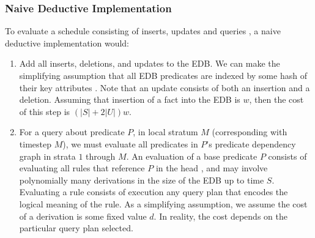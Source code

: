 \subsubsection{Naive Deductive Implementation}

To evaluate a schedule consisting of inserts, updates and queries , a naive deductive implementation would:

\begin{enumerate}

\item Add all inserts, deletions, and updates to the EDB.  We can make
the simplifying assumption that all EDB predicates are indexed by some hash of
their key attributes .  Note that
an update consists of both an insertion and a deletion.  Assuming that
insertion of a fact into the EDB is $w$, then the cost of this
step is $(|S|+2|U|)w$.

\item For a query about predicate $P$, in local stratum $M$ (corresponding with
timestep $M$), we must evaluate all predicates in $P$'s predicate dependency
graph in strata $1$ through $M$.  An evaluation of a base predicate $P$
consists of evaluating all rules that reference $P$ in the head , and may involve polynomially
many derivations in the size of the EDB up to time $S$.  Evaluating a rule
consists of execution any query plan that encodes the logical meaning of the
rule.    As a simplifying assumption, we assume the cost of a
derivation is some fixed value $d$.  In reality, the cost depends on the
particular query plan selected.  

\end{enumerate}

